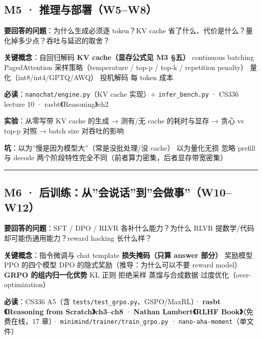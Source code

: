 \documentclass[
  chinese,
  11pt,
]{ctexart}
\begin{document}
\subsection{M5 · 推理与部署（W5--W8）}\label{m5-ux63a8ux7406ux4e0eux90e8ux7f72w5w8}

\textbf{要回答的问题}：为什么生成必须逐 token？KV cache 省了什么、代价是什么？量化掉多少点？吞吐与延迟的取舍？

\textbf{关键概念}：自回归解码 \textbar{} \textbf{KV cache（显存公式见 M3 §五）} \textbar{} continuous batching \textbar{} PagedAttention \textbar{} 采样策略（temperature / top-p / top-k / repetition penalty）\textbar{} 量化（int8/int4/GPTQ/AWQ）\textbar{} 投机解码 \textbar{} 每 token 成本

\textbf{必读}：\texttt{nanochat/engine.py}（KV cache 实现）+ \texttt{infer\_bench.py} · CS336 lecture 10 · rasbt《Reasoning》ch2

\textbf{实验}：从零写带 KV cache 的生成 → 测有/无 cache 的耗时与显存 → 贪心 vs top-p 对照 → batch size 对吞吐的影响

\textbf{坑}：以为''慢是因为模型大''（常是没批处理/没 cache）\textbar{} 以为量化无损 \textbar{} 忽略 prefill 与 decode 两个阶段特性完全不同（前者算力密集，后者显存带宽密集）

\begin{center}\rule{0.5\linewidth}{0.5pt}\end{center}

\subsection{M6 · 后训练：从''会说话''到''会做事''（W10--W12）}\label{m6-ux540eux8badux7ec3ux4eceux4f1aux8bf4ux8bddux5230ux4f1aux505aux4e8bw10w12}

\textbf{要回答的问题}：SFT / DPO / RLVR 各补什么能力？为什么 RLVR 提数学/代码却可能伤通用能力？reward hacking 长什么样？

\textbf{关键概念}：指令微调与 chat template \textbar{} \textbf{损失掩码（只算 answer 部分）} \textbar{} 奖励模型 \textbar{} PPO 的四个模型 \textbar{} DPO 的隐式奖励（推导：为什么可以不要 reward model）\textbar{} \textbf{GRPO 的组内归一化优势} \textbar{} KL 正则 \textbar{} 拒绝采样 \textbar{} 蒸馏与合成数据 \textbar{} 过度优化（over-optimization）

\textbf{必读}：CS336 A5（含 \texttt{tests/test\_grpo.py}、GSPO/MaxRL）· \textbf{rasbt《Reasoning from Scratch》ch3--ch8} · \textbf{Nathan Lambert《RLHF Book》}（免费在线，17 章）· \texttt{minimind/trainer/train\_grpo.py} · \texttt{nano-aha-moment}（单文件）
\end{document}
